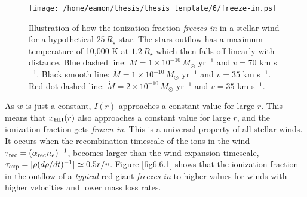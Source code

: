 \begin{figure}[hbt!]
\centering 
          \texttt{[image: /home/eamon/thesis/thesis\_template/6/freeze-in.ps]}
\caption[Illustration of how the ionization fraction \textit{freezes-in} in a stellar wind.]{Illustration of how the ionization fraction \textit{freezes-in} in a stellar wind for a hypothetical $25\,R_{\star}$ star. The stars outflow has a maximum temperature of 10,000 K at $1.2\,R_{\star}$ which then falls off linearly with distance. Blue dashed line: $\dot{M} = 1 \times 10^{-10}\,M_{\odot}$ yr$^{-1}$ and $v=70$ km s$^{-1}$. Black smooth line: $\dot{M} = 1 \times 10^{-10}\,M_{\odot}$ yr$^{-1}$ and $v=35$ km s$^{-1}$. Red dot-dashed line: $\dot{M} = 2 \times 10^{-10}\,M_{\odot}$ yr$^{-1}$ and $v=35$ km s$^{-1}$. }
\label{fig6.8}
\end{figure}

As $w$ is just a constant, $I(r)$ approaches a constant value for large $r$. This means that $x_{\rm{HII}}(r)$ also approaches a constant value for large $r$, and the ionization fraction gets \textit{frozen-in}. This is a universal property of all stellar winds. It occurs when the recombination timescale of the ions in the wind $\tau _{\rm{rec}}=(\alpha _{\rm{rec}}n_e)^{-1}$, becomes larger than the wind expansion timescale, $\tau _{\rm{exp}}=|\rho (d\rho/dt)^{-1}|\simeq 0.5r/v$. Figure \ref{fig6.6.1} shows that the ionization fraction in the outflow of a \textit{typical} red giant \textit{freezes-in} to higher values for winds with higher velocities and lower mass loss rates. 


